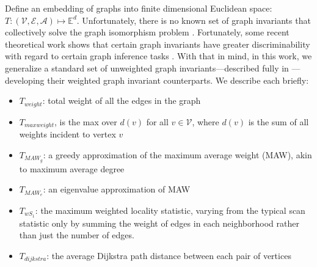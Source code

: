 \documentclass{article} %
\newcommand{\EE}{\mathbb{E}}           %
\providecommand{\mc}[1]{\mathcal{#1}}
\begin{document}
Define an embedding of graphs into finite dimensional Euclidean space: $T: (\mc{V},\mc{E},\mc{A}) \mapsto \EE^d$.  Unfortunately, there is no known set of graph invariants that collectively solve the graph isomorphism problem \cite{Conte2004}.  Fortunately, some recent theoretical work shows that certain graph invariants have greater discriminability with regard to certain graph inference tasks \cite{Ruhkhin2011}. With that in mind, in this work, we generalize a standard set of unweighted graph invariants---described fully in \cite{CPP11}---developing their weighted graph invariant counterparts. We describe each briefly:
\begin{itemize}
	\item $T_{weight}$: total weight of all the edges in the graph
	\item $T_{maxweight}$, is the max over $d(v)$ for all $v \in \mc{V}$, where $d(v)$ is the sum of all weights incident to vertex $v$	
	\item $T_{MAW_g}$: a greedy approximation of the maximum average weight (MAW), akin to maximum average degree
	\item $T_{MAW_e}$: an eigenvalue approximation of MAW
	\item $T_{wS_1}$: the maximum weighted locality statistic, varying from the typical scan statistic  only by summing the weight of edges in each neighborhood rather than just the number of edges.
	\item $T_{dijkstra}$: the average Dijkstra path distance between each pair of vertices
\end{itemize}
\end{document}
